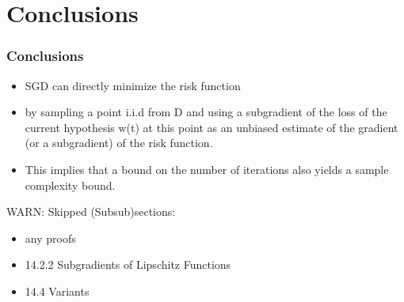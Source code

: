 \section{Conclusions}

\begin{frame}
\frametitle{Conclusions}

\begin{itemize}
    \item SGD can directly minimize the risk function
    \item by sampling a point i.i.d from D and using a subgradient of the loss of the
        current hypothesis w(t) at this point as an unbiased estimate of the gradient (or
        a subgradient) of the risk function.
    \item This implies that a bound on the number of iterations also yields a sample complexity bound.
\end{itemize}

WARN: Skipped (Subsub)sections:\\
\begin{itemize}
    \item any proofs
    \item 14.2.2 Subgradients of Lipschitz Functions
    \item 14.4 Variants
\end{itemize}

\end{frame}


